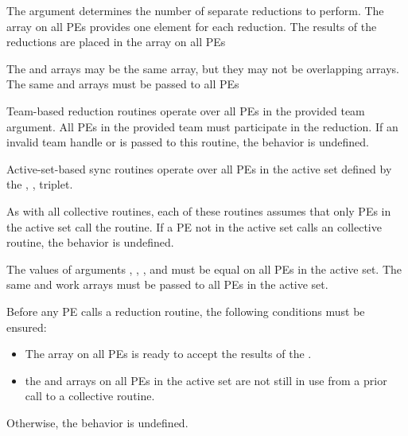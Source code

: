 \begin{apidefinition}
{    The  argument determines the number of separate reductions to
    perform.  The \source{} array on all \acp{PE} 
    provides one element for each reduction.  The results of the reductions are placed in the
    \dest{} array on all \acp{PE} 
    
    The \source{} and \dest{} arrays may be the same array, but they may not be
    overlapping arrays. The same \dest{} and \source{} arrays
    must be passed to all \acp{PE} 

{\color{Green}
    Team-based reduction routines operate over all \acp{PE} in the provided team argument. All
    \acp{PE} in the provided team must participate in the reduction. If an invalid team handle
    or  is passed to this routine, the behavior is undefined.

    Active-set-based sync routines operate over all \acp{PE} in the active set
    defined by the , ,  triplet.
}

    As with all \oldtext{\openshmem}  collective routines,
    each of these routines assumes
    that only \acp{PE} in the active set call the routine.  If a \ac{PE} not in
    the active set calls an \oldtext{\openshmem}  collective routine,
    the behavior is undefined.

    The values of arguments , , ,
    and  must be equal on all \acp{PE} in the active set.
    The same  and  work arrays must be passed to all
    \acp{PE} in the active set.

    Before any \ac{PE} calls a reduction routine, the following conditions must be ensured:
    \begin{itemize}
    \item The \dest{} array on all \acp{PE} 
      is ready to accept the results of the .
    \item {} the
       and  arrays on all \acp{PE} in the
      active set are not still in use from a prior call to a collective
      \openshmem routine.
    \end{itemize}
    Otherwise, the behavior is undefined.
    
}
\end{apidefinition}

